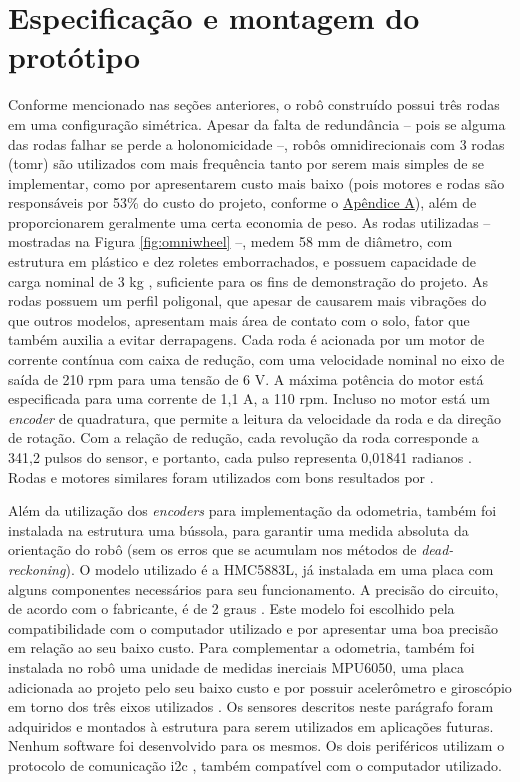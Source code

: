 

\section{Especificação e montagem do protótipo}
\label{sec:montagem}

Conforme mencionado nas seções anteriores, o robô construído possui três rodas em uma configuração simétrica. Apesar da falta de redundância -- pois se alguma das rodas falhar se perde a holonomicidade --, robôs omnidirecionais com 3 rodas (\acrshort{tomr}) são utilizados com mais frequência tanto por serem mais simples de se implementar, como por apresentarem custo mais baixo (pois motores e rodas são responsáveis por 53\% do custo do projeto, conforme o \hyperref[sec:custo]{Apêndice A}), além de proporcionarem geralmente uma certa economia de peso. As rodas utilizadas -- mostradas na Figura \ref{fig:omniwheel} --, medem 58 mm de diâmetro, com estrutura em plástico e dez roletes emborrachados, e possuem capacidade de carga nominal de 3 kg \citep{omniwheel}, suficiente para os fins de demonstração do projeto. As rodas possuem um perfil poligonal, que apesar de causarem mais vibrações do que outros modelos, apresentam mais área de contato com o solo, fator que também auxilia a evitar derrapagens. Cada roda é acionada por um motor de corrente contínua com caixa de redução, com uma velocidade nominal no eixo de saída de 210 rpm para uma tensão de 6 V. A máxima potência do motor está especificada para uma corrente de 1,1 A, a 110 rpm. Incluso no motor está um \textit{encoder} de quadratura, que permite a leitura da velocidade da roda e da direção de rotação. Com a relação de redução, cada revolução da roda corresponde a 341,2 pulsos do sensor, e portanto, cada pulso representa 0,01841 radianos \citep{motor}. Rodas e motores similares foram utilizados com bons resultados por \citet{samani2007comprehensive}.

Além da utilização dos \textit{encoders} para implementação da odometria, também foi instalada na estrutura uma bússola, para garantir uma medida absoluta da orientação do robô (sem os erros que se acumulam nos métodos de \textit{dead-reckoning}). O modelo utilizado é a HMC5883L, já instalada em uma placa com alguns componentes necessários para seu funcionamento. A precisão do circuito, de acordo com o fabricante, é de 2 graus \citep{HMC5883L}. Este modelo foi escolhido pela compatibilidade com o computador utilizado e por apresentar uma boa precisão em relação ao seu baixo custo. Para complementar a odometria, também foi instalada no robô uma unidade de medidas inerciais MPU6050, uma placa adicionada ao projeto pelo seu baixo custo e por possuir acelerômetro e giroscópio em torno dos três eixos utilizados \citep{MPU6050}. Os sensores descritos neste parágrafo foram adquiridos e montados à estrutura para serem utilizados em aplicações futuras. Nenhum software foi desenvolvido para os mesmos. Os dois periféricos utilizam o protocolo de comunicação \acrshort{i2c} \citep{semiconductors2000I2C}, também compatível com o computador utilizado.

